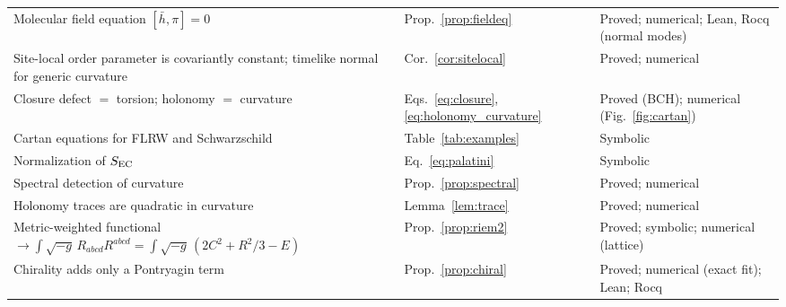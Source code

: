 \documentclass[reprint,aps,prd,amsmath,amssymb,superscriptaddress,nofootinbib,floatfix]{revtex4-2}
\theoremstyle{plain}
\theoremstyle{definition}
\theoremstyle{remark}
\begin{document}
\begin{table}[t]
\begin{ruledtabular}
\begin{tabular}{lll}
\parbox[t]{0.52\textwidth}{\raggedright Molecular field equation $[\bar h,\pi]=0$\strut} & \parbox[t]{0.17\textwidth}{\raggedright Prop.~\ref{prop:fieldeq}\strut} & \parbox[t]{0.25\textwidth}{\raggedright Proved; numerical; Lean, Rocq (normal modes)\strut} \\
\parbox[t]{0.52\textwidth}{\raggedright Site-local order parameter is covariantly constant; timelike normal for generic curvature\strut} & \parbox[t]{0.17\textwidth}{\raggedright Cor.~\ref{cor:sitelocal}\strut} & \parbox[t]{0.25\textwidth}{\raggedright Proved; numerical\strut} \\
\parbox[t]{0.52\textwidth}{\raggedright Closure defect $=$ torsion; holonomy $=$ curvature\strut} & \parbox[t]{0.17\textwidth}{\raggedright Eqs.~\eqref{eq:closure}, \eqref{eq:holonomy_curvature}\strut} & \parbox[t]{0.25\textwidth}{\raggedright Proved (BCH); numerical (Fig.~\ref{fig:cartan})\strut} \\
\parbox[t]{0.52\textwidth}{\raggedright Cartan equations for FLRW and Schwarzschild\strut} & \parbox[t]{0.17\textwidth}{\raggedright Table~\ref{tab:examples}\strut} & \parbox[t]{0.25\textwidth}{\raggedright Symbolic\strut} \\
\parbox[t]{0.52\textwidth}{\raggedright Normalization of $S_{\rm EC}$\strut} & \parbox[t]{0.17\textwidth}{\raggedright Eq.~\eqref{eq:palatini}\strut} & \parbox[t]{0.25\textwidth}{\raggedright Symbolic\strut} \\
\parbox[t]{0.52\textwidth}{\raggedright Spectral detection of curvature\strut} & \parbox[t]{0.17\textwidth}{\raggedright Prop.~\ref{prop:spectral}\strut} & \parbox[t]{0.25\textwidth}{\raggedright Proved; numerical\strut} \\
\parbox[t]{0.52\textwidth}{\raggedright Holonomy traces are quadratic in curvature\strut} & \parbox[t]{0.17\textwidth}{\raggedright Lemma~\ref{lem:trace}\strut} & \parbox[t]{0.25\textwidth}{\raggedright Proved; numerical\strut} \\
\parbox[t]{0.52\textwidth}{\raggedright Metric-weighted functional $\to\int\sqrt{-g}\,R_{abcd}R^{abcd}=\int\sqrt{-g}\,(2C^2+R^2/3-E)$\strut} & \parbox[t]{0.17\textwidth}{\raggedright Prop.~\ref{prop:riem2}\strut} & \parbox[t]{0.25\textwidth}{\raggedright Proved; symbolic; numerical (lattice)\strut} \\
\parbox[t]{0.52\textwidth}{\raggedright Chirality adds only a Pontryagin term\strut} & \parbox[t]{0.17\textwidth}{\raggedright Prop.~\ref{prop:chiral}\strut} & \parbox[t]{0.25\textwidth}{\raggedright Proved; numerical (exact fit); Lean; Rocq\strut} \\

\end{tabular}
\end{ruledtabular}
\end{table}
\end{document}
